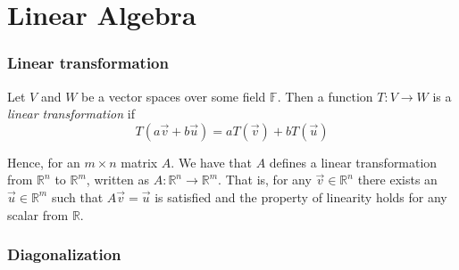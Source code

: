 \part{Linear Algebra}
\section{Linear transformation}
\begin{definition}
	Let $V$ and $W$ be a vector spaces over some field $\mathbb F$. Then a function $T\colon V\to W$ is a \emph{linear transformation} if 
	$$
	T(a\vec{v} + b\vec{u}) = aT(\vec{v}) + bT(\vec{u})
	$$
\end{definition}
Hence, for an $m\times n$ matrix $A$. We have that $A$ defines a linear transformation from $\mathbb R^n$ to $\mathbb R^m$, written as $A\colon\mathbb R^n \to \mathbb R^m$. That is, for any $\vec{v}\in\mathbb R^n$ there exists an $\vec{u}\in\mathbb R^m$ such that $A\vec{v} = \vec{u}$ is satisfied and the property of linearity holds for any scalar from $\mathbb R$.

\section{Diagonalization}
